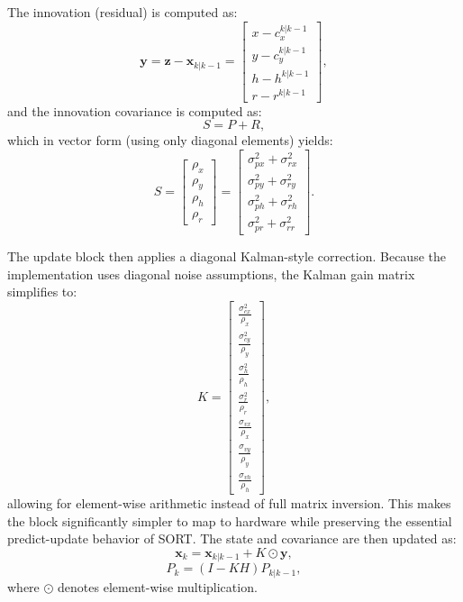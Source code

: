 The innovation (residual) is computed as:
\begin{equation}
	\mathbf{y} = \mathbf{z} - \mathbf{x}_{k|k-1} = \begin{bmatrix}
		x - c_x^{k|k-1} \\
		y - c_y^{k|k-1} \\
		h - h^{k|k-1} \\
		r - r^{k|k-1}
	\end{bmatrix},
\end{equation}
and the innovation covariance is computed as:
\begin{equation}
	S = P + R,
\end{equation}
which in vector form (using only diagonal elements) yields:
\begin{equation}
	S = \begin{bmatrix}
		\rho_x \\
		\rho_y \\
		\rho_h \\
		\rho_r
	\end{bmatrix} = \begin{bmatrix}
		\sigma^2_{px} + \sigma^2_{rx} \\
		\sigma^2_{py} + \sigma^2_{ry} \\
		\sigma^2_{ph} + \sigma^2_{rh} \\
		\sigma^2_{pr} + \sigma^2_{rr}
	\end{bmatrix}.
\end{equation}

The update block then applies a diagonal Kalman-style correction. Because the implementation 
uses diagonal noise assumptions, the Kalman gain matrix simplifies to:
\begin{equation}
	K = \begin{bmatrix}
		\frac{\sigma^2_{cx}}{\rho_x} \\
		\frac{\sigma^2_{cy}}{\rho_y} \\
		\frac{\sigma^2_h}{\rho_h} \\
		\frac{\sigma^2_r}{\rho_r} \\
		\frac{\sigma_{vx}}{\rho_x} \\
		\frac{\sigma_{vy}}{\rho_y} \\
		\frac{\sigma_{vh}}{\rho_h}
	\end{bmatrix},
\end{equation}
allowing for element-wise arithmetic instead of full matrix inversion. This makes the 
block significantly simpler to map to hardware while preserving the essential predict-update 
behavior of SORT. The state and covariance are then updated as:
\begin{equation}
	\mathbf{x}_k = \mathbf{x}_{k|k-1} + K \odot \mathbf{y},
\end{equation}
\begin{equation}
	P_k = (I - KH) P_{k|k-1},
\end{equation}
where $\odot$ denotes element-wise multiplication.

